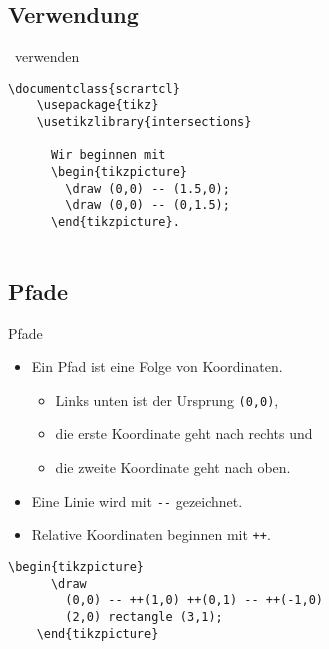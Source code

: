 \subsection{Verwendung}

\begin{Frame}[fragile]{\TikZ\ verwenden}

  \xxx

  \begin{lstlisting}[gobble=4]
    \documentclass{scrartcl}
    \usepackage{tikz}
    \usetikzlibrary{intersections}
    
      Wir beginnen mit
      \begin{tikzpicture}
        \draw (0,0) -- (1.5,0);
        \draw (0,0) -- (0,1.5);
      \end{tikzpicture}.
    
  \end{lstlisting}
\end{Frame}

\subsection{Pfade}

\begin{Frame}[fragile]{Pfade}
  \begin{itemize}
    \item Ein Pfad ist eine Folge von Koordinaten.
      \begin{itemize}
        \item Links unten ist der Ursprung \lstinline-(0,0)-,
        \item die erste Koordinate geht nach rechts und
        \item die zweite Koordinate geht nach oben.
      \end{itemize}
    \item Eine Linie wird mit \lstinline|--| gezeichnet.
    \item Relative Koordinaten beginnen mit \lstinline-++-.
  \end{itemize}

  \xxx


  \xxx

  \begin{lstlisting}[gobble=4]
    \begin{tikzpicture}
      \draw
        (0,0) -- ++(1,0) ++(0,1) -- ++(-1,0)
        (2,0) rectangle (3,1);
    \end{tikzpicture}
  \end{lstlisting}
\end{Frame}

